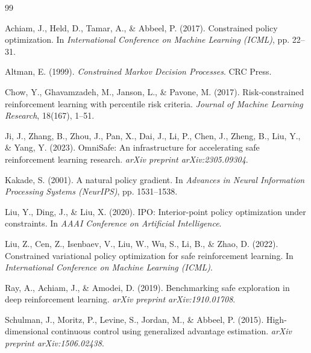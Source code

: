 \documentclass[12pt,a4paper]{article}
\theoremstyle{definition}
\begin{document}

\begin{thebibliography}{99}

Achiam, J., Held, D., Tamar, A., \& Abbeel, P. (2017).
\newblock Constrained policy optimization.
\newblock In \emph{International Conference on Machine Learning (ICML)}, pp. 22--31.

Altman, E. (1999).
\newblock \emph{Constrained Markov Decision Processes}.
\newblock CRC Press.

Chow, Y., Ghavamzadeh, M., Janson, L., \& Pavone, M. (2017).
\newblock Risk-constrained reinforcement learning with percentile risk criteria.
\newblock \emph{Journal of Machine Learning Research}, 18(167), 1--51.

Ji, J., Zhang, B., Zhou, J., Pan, X., Dai, J., Li, P., Chen, J., Zheng, B., Liu, Y., \& Yang, Y. (2023).
\newblock OmniSafe: An infrastructure for accelerating safe reinforcement learning research.
\newblock \emph{arXiv preprint arXiv:2305.09304}.

Kakade, S. (2001).
\newblock A natural policy gradient.
\newblock In \emph{Advances in Neural Information Processing Systems (NeurIPS)}, pp. 1531--1538.

Liu, Y., Ding, J., \& Liu, X. (2020).
\newblock IPO: Interior-point policy optimization under constraints.
\newblock In \emph{AAAI Conference on Artificial Intelligence}.

Liu, Z., Cen, Z., Isenbaev, V., Liu, W., Wu, S., Li, B., \& Zhao, D. (2022).
\newblock Constrained variational policy optimization for safe reinforcement learning.
\newblock In \emph{International Conference on Machine Learning (ICML)}.

Ray, A., Achiam, J., \& Amodei, D. (2019).
\newblock Benchmarking safe exploration in deep reinforcement learning.
\newblock \emph{arXiv preprint arXiv:1910.01708}.

Schulman, J., Moritz, P., Levine, S., Jordan, M., \& Abbeel, P. (2015).
\newblock High-dimensional continuous control using generalized advantage estimation.
\newblock \emph{arXiv preprint arXiv:1506.02438}.


\end{thebibliography}
\end{document}

